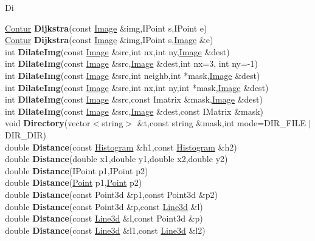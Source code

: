 \documentclass[10pt,titlepage]{article}
\def\functionlistentry#1#2#3#4#5#6{\noindent #1 {\bf #2}(#3) \dotfill #6\\}
\def\letterref#1{}
\def\letterlabel#1{\vspace{0.5cm}\centerline{\Large #1}}
\def\letterlabelend#1{}
\begin{document}
{{\letterlabel{Di}
\letterref{A}
\letterref{B}
\letterref{C}
\letterref{D}
\letterref{E}
\letterref{F}
\letterref{G}
\letterref{H}
\letterref{I}
\letterref{K}
\letterref{L}
\letterref{M}
\letterref{N}
\letterref{O}
\letterref{P}
\letterref{Q}
\letterref{R}
\letterref{S}
\letterref{T}
\letterref{U}
\letterref{V}
\letterref{W}
\letterref{X}
\letterref{Y}
\letterref{Z}

\letterref{De}
\letterref{Di}
\letterref{Do}
\letterref{Dr}
\letterref{Du}
\letterlabelend{Di}
\functionlistentry{\hyperlink{Contur}{Contur}}{Dijkstra}{const \hyperlink{Image}{Image} \&img,IPoint s,IPoint e}{1300}{graph}{}
\functionlistentry{\hyperlink{Contur}{Contur}}{Dijkstra}{const \hyperlink{Image}{Image} \&img,IPoint s,\hyperlink{Image}{Image} \&e}{1301}{graph}{}
\functionlistentry{int}{DilateImg}{const \hyperlink{Image}{Image} \&src,int nx,int ny,\hyperlink{Image}{Image} \&dest}{373}{filter}{}
\functionlistentry{int}{DilateImg}{const \hyperlink{Image}{Image} \&src,\hyperlink{Image}{Image} \&dest,int nx=3, int ny=-1}{374}{filter}{}
\functionlistentry{int}{DilateImg}{const \hyperlink{Image}{Image} \&src,int neighb,int *mask,\hyperlink{Image}{Image} \&dest}{375}{filter}{}
\functionlistentry{int}{DilateImg}{const \hyperlink{Image}{Image} \&src,int nx,int ny,int *mask,\hyperlink{Image}{Image} \&dest}{376}{filter}{}
\functionlistentry{int}{DilateImg}{const \hyperlink{Image}{Image} \&src,const Imatrix \&mask,\hyperlink{Image}{Image} \&dest}{377}{filter}{}
\functionlistentry{int}{DilateImg}{const \hyperlink{Image}{Image} \&src,\hyperlink{Image}{Image} \&dest,const IMatrix \&mask}{378}{filter}{}
\functionlistentry{void}{Directory}{vector$<$string$>$ \&t,const string \&mask,int mode=DIR\_FILE $|$ DIR\_DIR}{1446}{genericTools}{}
\functionlistentry{double}{Distance}{const \hyperlink{Histogram}{Histogram} \&h1,const \hyperlink{Histogram}{Histogram} \&h2}{900}{statistics}{}
\functionlistentry{double}{Distance}{double x1,double y1,double x2,double y2}{1363}{numeric}{}
\functionlistentry{double}{Distance}{IPoint p1,IPoint p2}{1364}{numeric}{}
\functionlistentry{double}{Distance}{\hyperlink{Point}{Point} p1,\hyperlink{Point}{Point} p2}{1365}{numeric}{}
\functionlistentry{double}{Distance}{const Point3d \&p1,const Point3d \&p2}{1384}{numeric}{}
\functionlistentry{double}{Distance}{const Point3d \&p,const \hyperlink{Line3d}{Line3d} \&l}{1385}{numeric}{}
\functionlistentry{double}{Distance}{const \hyperlink{Line3d}{Line3d} \&l,const Point3d \&p}{1386}{numeric}{}
\functionlistentry{double}{Distance}{const \hyperlink{Line3d}{Line3d} \&l1,const \hyperlink{Line3d}{Line3d} \&l2}{1387}{numeric}{}
}}
\end{document}
